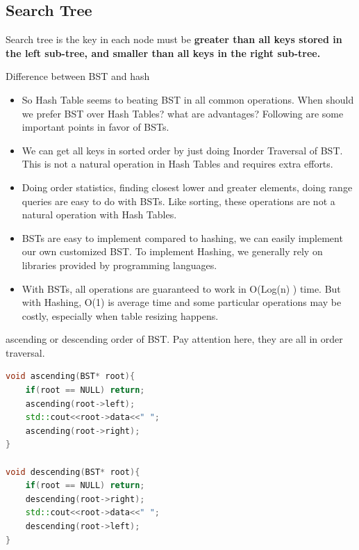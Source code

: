 \documentclass[a4paper,11pt,twoside]{book}
\begin{document}
 
\subsection{Search Tree}

	\par Search tree is the key in each node must be \textbf{greater than all keys stored in the left sub-tree, and smaller than all keys in the right sub-tree.} 

	\par Difference between BST and hash
\begin{itemize}
	\item So Hash Table seems to beating BST in all common operations. When should we prefer BST over Hash Tables? what are advantages? Following are some important points in favor of BSTs.
	
	\item We can get all keys in sorted order by just doing Inorder Traversal of BST. This is not a natural operation in Hash Tables and requires extra efforts.
	
	\item Doing order statistics, finding closest lower and greater elements, doing range queries are easy to do with BSTs. Like sorting, these operations are not a natural operation with Hash Tables.
	
	\item BSTs are easy to implement compared to hashing, we can easily implement our own customized BST. To implement Hashing, we generally rely on libraries provided by programming languages.
	
	\item With BSTs, all operations are guaranteed to work in O(Log(n) ) time. But with Hashing, O(1) is average time and some particular operations may be costly, especially when table resizing happens.
\end{itemize}

	\par ascending or descending order of BST. Pay attention here, they are all in order traversal.
\begin{lstlisting}[frame=single, language=c++]
void ascending(BST* root){
    if(root == NULL) return;
    ascending(root->left);
    std::cout<<root->data<<" ";
    ascending(root->right);
}
 
void descending(BST* root){
    if(root == NULL) return;
    descending(root->right);
    std::cout<<root->data<<" ";
    descending(root->left);
}
\end{lstlisting}
\end{document}
